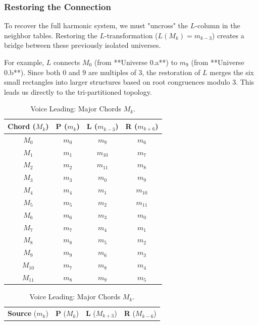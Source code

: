 \documentclass[12pt,letterpaper]{amsart}
\begin{document}
\subsubsection{Restoring the Connection}
To recover the full harmonic system, we must "uncross" the $L$-column in the neighbor tables. Restoring the $L$-transformation ($L(M_k) = m_{k-3}$) creates a bridge between these previously isolated universes. 

For example, $L$ connects $M_0$ (from **Universe 0.a**) to $m_9$ (from **Universe 0.b**). Since both $0$ and $9$ are multiples of 3, the restoration of $L$ merges the six small rectangles into larger structures based on root congruences modulo 3. This leads us directly to the tri-partitioned topology.

\begin{table}[H]
\centering
\scriptsize
\renewcommand{\arraystretch}{1.2}
\begin{minipage}{0.48\textwidth}
\centering
\begin{tabular}{|c||c|c|c|}
\hline
\textbf{Chord} ($M_k$) & \textbf{P} ($m_k$) & \textbf{L} ($m_{k-3}$) & \textbf{R} ($m_{k+6}$) \\
\hline
$M_0$ & $m_0$ & $m_{9}$ & $m_6$ \\
$M_1$ & $m_1$ & $m_{10}$ & $m_7$ \\
$M_2$ & $m_2$ & $m_{11}$ & $m_8$ \\
$M_3$ & $m_3$ & $m_{0}$ & $m_9$ \\
$M_4$ & $m_4$ & $m_{1}$ & $m_{10}$ \\
$M_5$ & $m_5$ & $m_{2}$ & $m_{11}$ \\
$M_6$ & $m_6$ & $m_{3}$ & $m_{0}$ \\
$M_7$ & $m_7$ & $m_{4}$ & $m_{1}$ \\
$M_8$ & $m_8$ & $m_{5}$ & $m_{2}$ \\
$M_9$ & $m_9$ & $m_{6}$ & $m_{3}$ \\
$M_{10}$ & $m_{7}$ & $m_{8}$ & $m_{4}$ \\
$M_{11}$ & $m_{8}$ & $m_{9}$ & $m_{5}$ \\
\hline
\end{tabular}
\caption{Voice Leading: Major Chords $M_k$.}
\end{minipage}
\hfill
\begin{minipage}{0.48\textwidth}
\centering
\begin{tabular}{|c||c|c|c|}
\hline
\textbf{Source} ($m_k$) & \textbf{P} ($M_k$) & \textbf{L} ($M_{k+3}$) & \textbf{R} ($M_{k-6}$) \\

\end{tabular}
\end{minipage}
\end{table}
\end{document}
